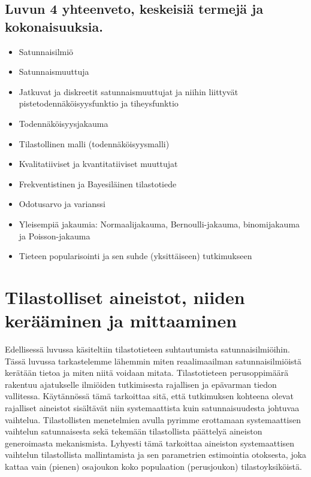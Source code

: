 \documentclass[
]{book}
\providecommand{\tightlist}{%
  \setlength{\itemsep}{0pt}\setlength{\parskip}{0pt}}
\begin{document}
\hypertarget{luvun-4-yhteenveto-keskeisiuxe4-termejuxe4-ja-kokonaisuuksia.}{%
\section{Luvun 4 yhteenveto, keskeisiä termejä ja kokonaisuuksia.}\label{luvun-4-yhteenveto-keskeisiuxe4-termejuxe4-ja-kokonaisuuksia.}}

\begin{itemize}
\tightlist
\item
  Satunnaisilmiö
\item
  Satunnaismuuttuja
\item
  Jatkuvat ja diskreetit satunnaismuuttujat ja niihin liittyvät pistetodennäköisyysfunktio ja tiheysfunktio
\item
  Todennäköisyysjakauma
\item
  Tilastollinen malli (todennäköisyysmalli)
\item
  Kvalitatiiviset ja kvantitatiiviset muuttujat
\item
  Frekventistinen ja Bayesiläinen tilastotiede
\item
  Odotusarvo ja varianssi
\item
  Yleisempiä jakaumia: Normaalijakauma, Bernoulli-jakauma, binomijakauma ja Poisson-jakauma
\item
  Tieteen popularisointi ja sen suhde (yksittäiseen) tutkimukseen
\end{itemize}

\hypertarget{luku5}{%
\chapter{Tilastolliset aineistot, niiden kerääminen ja mittaaminen}\label{luku5}}

Edellisessä luvussa käsiteltiin tilastotieteen suhtautumista satunnaisilmiöihin. Tässä luvussa tarkastelemme lähemmin miten reaalimaailman satunnaisilmiöistä kerätään tietoa ja miten niitä voidaan mitata. Tilastotieteen perusoppimäärä rakentuu ajatukselle ilmiöiden tutkimisesta rajallisen ja epävarman tiedon vallitessa. Käytännössä tämä tarkoittaa sitä, että tutkimuksen kohteena olevat rajalliset aineistot sisältävät niin systemaattista kuin satunnaisuudesta johtuvaa vaihtelua. Tilastollisten menetelmien avulla pyrimme erottamaan systemaattisen vaihtelun satunnaisesta sekä tekemään tilastollista päättelyä aineiston generoimasta mekanismista. Lyhyesti tämä tarkoittaa aineiston systemaattisen vaihtelun tilastollista mallintamista ja sen parametrien estimointia otoksesta, joka kattaa vain (pienen) osajoukon koko populaation (perusjoukon) tilastoyksiköistä.
\end{document}
